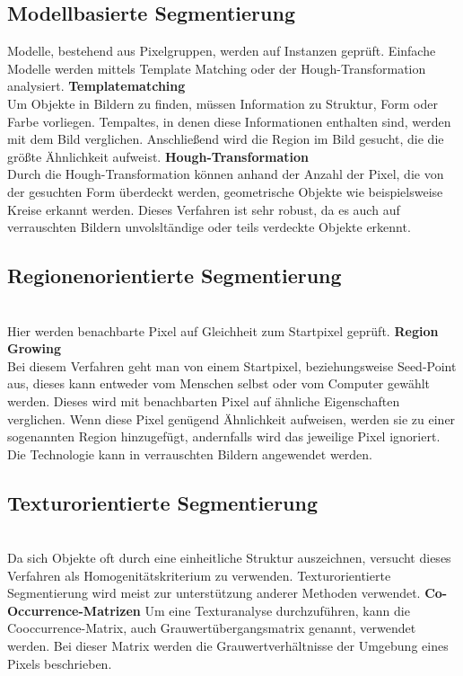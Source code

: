     \subsection*{Modellbasierte Segmentierung}
    Modelle, bestehend aus Pixelgruppen, werden auf Instanzen geprüft. Einfache Modelle werden mittels Template Matching oder der Hough-Transformation analysiert. \cite{Seg_modell}
    \textbf{Templatematching}\\
    Um Objekte in Bildern zu finden, müssen Information zu Struktur, Form oder Farbe vorliegen. Tempaltes, in denen diese Informationen enthalten sind, werden mit dem Bild verglichen. Anschließend wird die Region im Bild gesucht, die die größte Ähnlichkeit aufweist.
    \textbf{Hough-Transformation}\\
    Durch die Hough-Transformation können anhand der Anzahl der Pixel, die von der gesuchten Form überdeckt werden, geometrische Objekte wie beispielsweise Kreise erkannt werden. Dieses Verfahren ist sehr robust, da es auch auf verrauschten Bildern unvolsltändige oder teils verdeckte Objekte erkennt.

    \subsection*{Regionenorientierte Segmentierung}\\ \cite{Seg_region}
    Hier werden benachbarte Pixel auf Gleichheit zum Startpixel geprüft.
    \textbf{Region Growing}\\
    Bei diesem Verfahren geht man von einem Startpixel, beziehungsweise Seed-Point aus, dieses kann entweder vom Menschen selbst oder vom Computer gewählt werden. Dieses wird mit benachbarten Pixel auf ähnliche Eigenschaften verglichen. Wenn diese Pixel genügend Ähnlichkeit aufweisen, werden sie zu einer sogenannten Region hinzugefügt, andernfalls wird das jeweilige Pixel ignoriert. Die Technologie kann in verrauschten Bildern angewendet werden.

    \subsection*{Texturorientierte Segmentierung}\\ \cite{Seg_textur}
    Da sich Objekte oft durch eine einheitliche Struktur auszeichnen, versucht dieses Verfahren als Homogenitätskriterium zu verwenden. Texturorientierte Segmentierung wird meist zur unterstützung anderer Methoden verwendet.
    \textbf{Co-Occurrence-Matrizen}
    Um eine Texturanalyse durchzuführen, kann die Cooccurrence-Matrix, auch Grauwertübergangsmatrix genannt, verwendet werden. \cite{seg_coocc}
    Bei dieser Matrix werden die Grauwertverhältnisse der Umgebung eines Pixels beschrieben.

